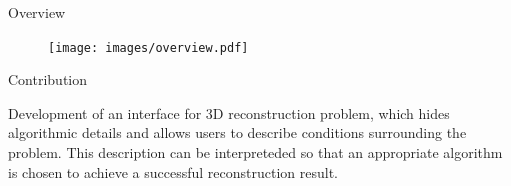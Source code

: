 \documentclass[10pt]{beamer}
\begin{document}
\begin{frame}{Overview}

\begin{figure}
\centering
\texttt{[image: images/overview.pdf]}
\end{figure}

\end{frame}

\begin{frame}{Contribution}

Development of an interface for 3D reconstruction problem, which hides algorithmic details and allows users to describe conditions surrounding the problem. This description can be interpreteded so that an appropriate algorithm is chosen to achieve a successful reconstruction result.

\end{frame}




\end{document}
